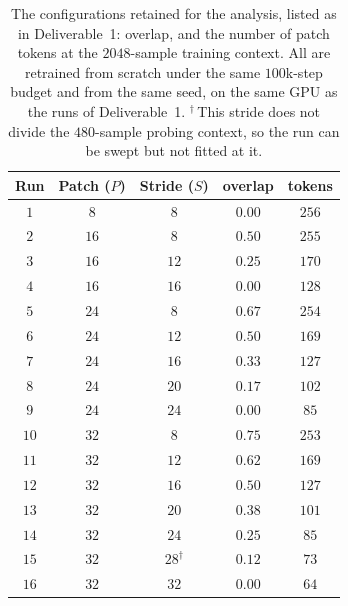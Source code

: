 \begin{table}[!b]
    \centering
    \small
    \begin{tabular}{@{}ccccc@{}}
        \toprule
        \textbf{Run} & \textbf{Patch ($P$)} & \textbf{Stride ($S$)} & \textbf{overlap} & \textbf{tokens} \\
        \midrule
        $1$ & $8$ & $8$ & $0.00$ & $256$ \\
        \midrule
        $2$ & $16$ & $8$ & $0.50$ & $255$ \\
        $3$ & $16$ & $12$ & $0.25$ & $170$ \\
        $4$ & $16$ & $16$ & $0.00$ & $128$ \\
        \midrule
        $5$ & $24$ & $8$ & $0.67$ & $254$ \\
        $6$ & $24$ & $12$ & $0.50$ & $169$ \\
        $7$ & $24$ & $16$ & $0.33$ & $127$ \\
        $8$ & $24$ & $20$ & $0.17$ & $102$ \\
        $9$ & $24$ & $24$ & $0.00$ & $85$ \\
        \midrule
        $10$ & $32$ & $8$ & $0.75$ & $253$ \\
        $11$ & $32$ & $12$ & $0.62$ & $169$ \\
        $12$ & $32$ & $16$ & $0.50$ & $127$ \\
        $13$ & $32$ & $20$ & $0.38$ & $101$ \\
        $14$ & $32$ & $24$ & $0.25$ & $85$ \\
        $15$ & $32$ & $28^{\dagger}$ & $0.12$ & $73$ \\
        $16$ & $32$ & $32$ & $0.00$ & $64$ \\
        \bottomrule
    \end{tabular}
    \caption{The configurations retained for the analysis, listed as in Deliverable~1: overlap, and the number of patch tokens at the $2048$-sample training context. All are retrained from scratch under the same $100$k-step budget and from the same seed, on the same GPU as the runs of Deliverable~1. $^{\dagger}$\,This stride does not divide the $480$-sample probing context, so the run can be swept but not fitted at it.}
    \label{tab:hfModels}
\end{table}
